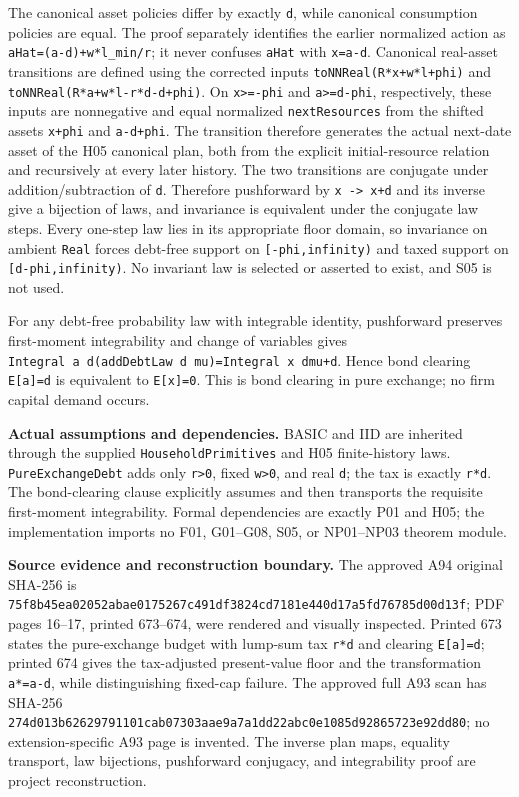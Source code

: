 \documentclass[
  11pt,
]{article}
\let\LedgerOriginalTexttt\texttt
\renewcommand{\texttt}[1]{{\small\LedgerOriginalTexttt{#1}}}
\begin{document}
The canonical asset policies differ by exactly \texttt{d}, while
canonical consumption policies are equal. The proof separately
identifies the earlier normalized action as
\texttt{aHat=(a-d)+w*l\_min/r}; it never confuses \texttt{aHat} with
\texttt{x=a-d}. Canonical real-asset transitions are defined using the
corrected inputs \texttt{toNNReal(R*x+w*l+phi)} and
\texttt{toNNReal(R*a+w*l-r*d-d+phi)}. On \texttt{x\textgreater{}=-phi}
and \texttt{a\textgreater{}=d-phi}, respectively, these inputs are
nonnegative and equal normalized \texttt{nextResources} from the shifted
assets \texttt{x+phi} and \texttt{a-d+phi}. The transition therefore
generates the actual next-date asset of the H05 canonical plan, both
from the explicit initial-resource relation and recursively at every
later history. The two transitions are conjugate under
addition/subtraction of \texttt{d}. Therefore pushforward by
\texttt{x\ \textbar{}-\textgreater{}\ x+d} and its inverse give a
bijection of laws, and invariance is equivalent under the conjugate law
steps. Every one-step law lies in its appropriate floor domain, so
invariance on ambient \texttt{Real} forces debt-free support on
\texttt{{[}-phi,infinity)} and taxed support on
\texttt{{[}d-phi,infinity)}. No invariant law is selected or asserted to
exist, and S05 is not used.

For any debt-free probability law with integrable identity, pushforward
preserves first-moment integrability and change of variables gives
\texttt{Integral\ a\ d(addDebtLaw\ d\ mu)=Integral\ x\ dmu+d}. Hence
bond clearing \texttt{E{[}a{]}=d} is equivalent to \texttt{E{[}x{]}=0}.
This is bond clearing in pure exchange; no firm capital demand occurs.

\textbf{Actual assumptions and dependencies.} BASIC and IID are
inherited through the supplied \texttt{HouseholdPrimitives} and H05
finite-history laws. \texttt{PureExchangeDebt} adds only
\texttt{r\textgreater{}0}, fixed \texttt{w\textgreater{}0}, and real
\texttt{d}; the tax is exactly \texttt{r*d}. The bond-clearing clause
explicitly assumes and then transports the requisite first-moment
integrability. Formal dependencies are exactly P01 and H05; the
implementation imports no F01, G01--G08, S05, or NP01--NP03 theorem
module.

\textbf{Source evidence and reconstruction boundary.} The approved A94
original SHA-256 is
\texttt{75f8b45ea02052abae0175267c491df3824cd7181e440d17a5fd76785d00d13f};
PDF pages 16--17, printed 673--674, were rendered and visually
inspected. Printed 673 states the pure-exchange budget with lump-sum tax
\texttt{r*d} and clearing \texttt{E{[}a{]}=d}; printed 674 gives the
tax-adjusted present-value floor and the transformation \texttt{a*=a-d},
while distinguishing fixed-cap failure. The approved full A93 scan has
SHA-256
\texttt{274d013b62629791101cab07303aae9a7a1dd22abc0e1085d92865723e92dd80};
no extension-specific A93 page is invented. The inverse plan maps,
equality transport, law bijections, pushforward conjugacy, and
integrability proof are project reconstruction.
\end{document}
